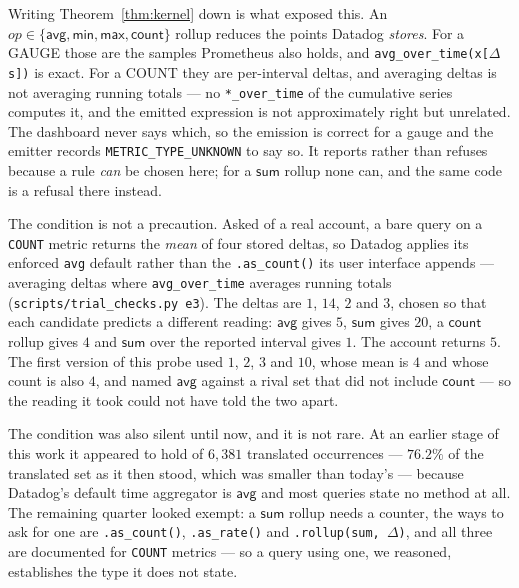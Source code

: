 \begin{remark}%
\label{rem:gauge}
Writing Theorem~\ref{thm:kernel} down is what exposed this. An
$\mathit{op}\in\{\mathsf{avg},\mathsf{min},\mathsf{max},\mathsf{count}\}$ rollup reduces
the points Datadog \emph{stores}. For a GAUGE those are the samples Prometheus also
holds, and \texttt{avg\_over\_time(x[$\Delta$s])} is exact. For a COUNT they are
per-interval deltas, and averaging deltas is not averaging running totals --- no
\texttt{*\_over\_time} of the cumulative series computes it, and the emitted expression is
not approximately right but unrelated. The dashboard never says which, so the emission is
correct for a gauge and the emitter records \texttt{METRIC\_TYPE\_UNKNOWN} to say so. It
reports rather than refuses
because a rule \emph{can} be chosen here; for a $\mathsf{sum}$ rollup none can, and the
same code is a refusal there instead.

The condition is not a precaution. Asked of a real account, a bare query on a
\texttt{COUNT} metric returns the \emph{mean} of four stored deltas,
so Datadog applies its enforced \texttt{avg} default rather than the \texttt{.as\_count()}
its user interface appends --- averaging deltas where \texttt{avg\_over\_time} averages
running totals (\texttt{scripts\slash trial\_checks.py e3}). The deltas are $1$, $14$,
$2$ and $3$, chosen so that each candidate predicts a different reading: $\mathsf{avg}$
gives $5$, $\mathsf{sum}$ gives $20$, a $\mathsf{count}$ rollup gives $4$ and
$\mathsf{sum}$ over the reported interval gives $1$. The account returns $5$. The first
version of this probe used $1$, $2$, $3$ and $10$, whose mean is $4$ and whose count is
also $4$, and named $\mathsf{avg}$ against a rival set that did not include
$\mathsf{count}$ --- so the reading it took could not have told the two apart.

The condition was also silent until now, and it is not rare. At an earlier stage of this
work it appeared to hold of $6{,}381$ translated occurrences --- $76.2\%$ of the
translated set as it then stood, which was smaller than today's --- because Datadog's
default time aggregator is $\mathsf{avg}$ and most queries state no method at all. The remaining quarter looked exempt: a $\mathsf{sum}$ rollup needs a
counter, the ways to ask for one are \texttt{.as\_count()}, \texttt{.as\_rate()} and
\texttt{.rollup(sum, $\Delta$)}, and all three are documented for \texttt{COUNT}
metrics --- so a query using one, we reasoned, establishes the type it does not state.


\end{remark}
